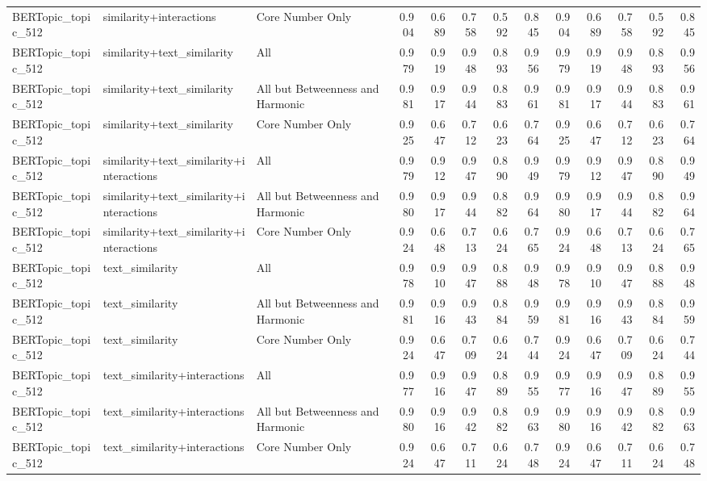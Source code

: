 \begin{tabular}{lllrrrrrrrrrr}
BERTopic_topic_512 & similarity+interactions & Core Number Only & 0.904 & 0.689 & 0.758 & 0.592 & 0.845 & 0.904 & 0.689 & 0.758 & 0.592 & 0.845 \\
BERTopic_topic_512 & similarity+text_similarity & All & 0.979 & 0.919 & 0.948 & 0.893 & 0.956 & 0.979 & 0.919 & 0.948 & 0.893 & 0.956 \\
BERTopic_topic_512 & similarity+text_similarity & All but Betweenness and Harmonic & 0.981 & 0.917 & 0.944 & 0.883 & 0.961 & 0.981 & 0.917 & 0.944 & 0.883 & 0.961 \\
BERTopic_topic_512 & similarity+text_similarity & Core Number Only & 0.925 & 0.647 & 0.712 & 0.623 & 0.764 & 0.925 & 0.647 & 0.712 & 0.623 & 0.764 \\
BERTopic_topic_512 & similarity+text_similarity+interactions & All & 0.979 & 0.912 & 0.947 & 0.890 & 0.949 & 0.979 & 0.912 & 0.947 & 0.890 & 0.949 \\
BERTopic_topic_512 & similarity+text_similarity+interactions & All but Betweenness and Harmonic & 0.980 & 0.917 & 0.944 & 0.882 & 0.964 & 0.980 & 0.917 & 0.944 & 0.882 & 0.964 \\
BERTopic_topic_512 & similarity+text_similarity+interactions & Core Number Only & 0.924 & 0.648 & 0.713 & 0.624 & 0.765 & 0.924 & 0.648 & 0.713 & 0.624 & 0.765 \\
BERTopic_topic_512 & text_similarity & All & 0.978 & 0.910 & 0.947 & 0.888 & 0.948 & 0.978 & 0.910 & 0.947 & 0.888 & 0.948 \\
BERTopic_topic_512 & text_similarity & All but Betweenness and Harmonic & 0.981 & 0.916 & 0.943 & 0.884 & 0.959 & 0.981 & 0.916 & 0.943 & 0.884 & 0.959 \\
BERTopic_topic_512 & text_similarity & Core Number Only & 0.924 & 0.647 & 0.709 & 0.624 & 0.744 & 0.924 & 0.647 & 0.709 & 0.624 & 0.744 \\
BERTopic_topic_512 & text_similarity+interactions & All & 0.977 & 0.916 & 0.947 & 0.889 & 0.955 & 0.977 & 0.916 & 0.947 & 0.889 & 0.955 \\
BERTopic_topic_512 & text_similarity+interactions & All but Betweenness and Harmonic & 0.980 & 0.916 & 0.942 & 0.882 & 0.963 & 0.980 & 0.916 & 0.942 & 0.882 & 0.963 \\
BERTopic_topic_512 & text_similarity+interactions & Core Number Only & 0.924 & 0.647 & 0.711 & 0.624 & 0.748 & 0.924 & 0.647 & 0.711 & 0.624 & 0.748 \\
\bottomrule
\end{tabular}
